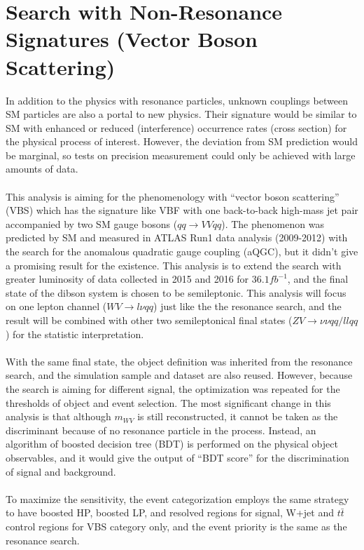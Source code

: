 \chapter{Search with Non-Resonance Signatures (Vector Boson Scattering)}

In addition to the physics with resonance particles, unknown couplings between SM particles are also a portal to new physics. Their signature would be similar to SM with enhanced or reduced (interference) occurrence rates (cross section) for the physical process of interest. However, the deviation from SM prediction would be marginal, so tests on precision measurement could only be achieved with large amounts of data. 
\\
\\This analysis is aiming for the phenomenology with ``vector boson scattering'' (VBS) which has the signature like VBF with one back-to-back high-mass jet pair accompanied by two SM gauge bosons ($qq \to VVqq$). The phenomenon was predicted by SM and measured in ATLAS Run1 data analysis (2009-2012) with the search for the anomalous quadratic gauge coupling (aQGC), but it didn't give a promising result\cite{STDM-2014-05} for the existence. This analysis is to extend the search with greater luminosity of data collected in 2015 and 2016 for $36.1fb^{-1}$, and the final state of the dibson system is chosen to be semileptonic. This analysis will focus on one lepton channel ($WV \to l\nu qq$) just like the the resonance search, and the result will be combined with other two semileptonical final states ($ZV \to \nu\nu qq/llqq$) for the statistic interpretation.
\\
\\With the same final state, the object definition was inherited from the resonance search, and the simulation sample and dataset are also reused. However, because the search is aiming for different signal, the optimization was repeated for the thresholds of object and event selection.  The most significant change in this analysis is that although $m_{WV}$ is still reconstructed, it cannot be taken as the discriminant because of no resonance particle in the process. Instead, an algorithm of boosted decision tree (BDT) is performed on the physical object observables, and it would give the output of ``BDT score'' for the discrimination of signal and background.
\\ 
\\To maximize the sensitivity, the event categorization employs the same strategy to have boosted HP, boosted LP, and resolved regions for signal, W+jet and $t\bar{t}$ control regions for VBS category only, and the event priority is the same as the resonance search.
